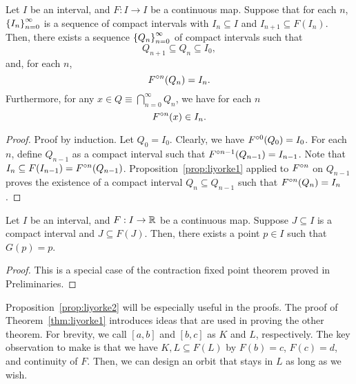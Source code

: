 \documentclass[12pt,draft,twoside]{book}
\begin{document}
\begin{proposition}
  Let $I$ be an interval, and $F: I\to I$ be a continuous map.
  Suppose that for each $n$, $\left \{ I_n \right \}^{\infty}_{n=0}$ is a sequence of compact intervals with $I_n \subseteq I$ and $I_{n+1} \subseteq F(I_n)$.
  Then, there exists a sequence $\left \{ Q_n \right \}^{\infty}_{n=0}$ of compact intervals such that 
\begin{equation*}
    Q_{n+1} \subseteq Q_{n} \subseteq I_0,
  \end{equation*}
and, for each $n$,
  \begin{equation*}
    F^{\circ n}(Q_n) = I_n.
  \end{equation*}
  Furthermore, for any $x \in Q \equiv \bigcap\limits_{n=0}^{\infty}Q_n$, we have for each $n$
  \begin{equation*}
    F^{\circ n}(x) \in I_n.
  \end{equation*}
  \label{prop:liyorke2}
  \begin{proof}
    Proof by induction.
    Let $Q_0 = I_0$.
    Clearly, we have $F^{\circ 0}(Q_0) = I_0$.
    For each $n$, define $Q_{n-1}$ as a compact interval such that $F^{\circ n-1}(Q_{n-1}) = I_{n-1}$.
    Note that $I_n \subseteq F(I_{n-1}) = F^{\circ n}(Q_{n-1})$.
    Proposition~\ref{prop:liyorke1} applied to $F^{\circ n}$ on $Q_{n-1}$ proves the existence of a compact interval $Q_n \subseteq Q_{n-1}$ such that $F^{\circ n}(Q_n) = I_n$.
  \end{proof}
\end{proposition}
\begin{proposition}
  Let $I$ be an interval, and $F: I\to \mathbb{R}$ be a continuous map.
  Suppose $J \subseteq I$ is a compact interval and $J \subseteq F(J)$. 
  Then, there exists a point $p \in I$ such that $G(p) = p$.
  \begin{proof}
    This is a special case of the contraction fixed point theorem proved in Preliminaries.
  \end{proof}
  \label{prop:liyorke3}
\end{proposition}
Proposition~\ref{prop:liyorke2} will be especially useful in the proofs.
The proof of Theorem~\ref{thm:liyorke1} introduces ideas that are used in proving the other theorem.
For brevity, we call $[a,b]$ and $[b,c]$ as $K$ and $L$, respectively.
The key observation to make is that we have $K,L \subseteq F(L)$ by $F(b) = c$, $F(c) = d$, and continuity of $F$.
Then, we can design an orbit that stays in $L$ as long as we wish.
\end{document}
